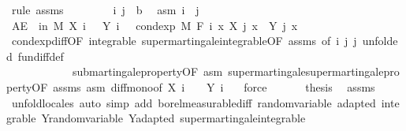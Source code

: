 \begin{isabellebody}
\ {\isacharparenleft}{\kern0pt}rule\ assms{\isacharparenright}{\kern0pt}\isanewline
\ \ \isacommand{{\isacharbraceleft}{\kern0pt}}\isamarkupfalse%
\isanewline
\ \ \ \ \isamarkupfalse%
\ i\ j\ {\isacharcolon}{\kern0pt}{\isacharcolon}{\kern0pt}\ {\isacharprime}{\kern0pt}b\ \isamarkupfalse%
\ asm{\isacharcolon}{\kern0pt}\ {\isachardoublequoteopen}i\ {\isasymle}\ j{\isachardoublequoteclose}\isanewline
\ \ \ \ \isamarkupfalse%
\ {\isachardoublequoteopen}AE\ {\isasymxi}\ in\ M{\isachardot}{\kern0pt}\ X\ i\ {\isasymxi}\ {\isacharminus}{\kern0pt}\ Y\ i\ {\isasymxi}\ {\isasymle}\ cond{\isacharunderscore}{\kern0pt}exp\ M\ {\isacharparenleft}{\kern0pt}F\ i{\isacharparenright}{\kern0pt}\ {\isacharparenleft}{\kern0pt}{\isasymlambda}x{\isachardot}{\kern0pt}\ X\ j\ x\ {\isacharminus}{\kern0pt}\ Y\ j\ x{\isacharparenright}{\kern0pt}\ {\isasymxi}{\isachardoublequoteclose}\ \isanewline
\ \ \ \ \ \ \isamarkupfalse%
\ cond{\isacharunderscore}{\kern0pt}exp{\isacharunderscore}{\kern0pt}diff{\isacharbrackleft}{\kern0pt}OF\ integrable\ supermartingale{\isachardot}{\kern0pt}integrable{\isacharbrackleft}{\kern0pt}OF\ assms{\isacharbrackright}{\kern0pt}{\isacharcomma}{\kern0pt}\ of\ i\ j\ j{\isacharcomma}{\kern0pt}\ unfolded\ fun{\isacharunderscore}{\kern0pt}diff{\isacharunderscore}{\kern0pt}def{\isacharbrackright}{\kern0pt}\ \isanewline
\ \ \ \ \ \ \ \ \ \ \ \ submartingale{\isacharunderscore}{\kern0pt}property{\isacharbrackleft}{\kern0pt}OF\ asm{\isacharbrackright}{\kern0pt}\ supermartingale{\isachardot}{\kern0pt}supermartingale{\isacharunderscore}{\kern0pt}property{\isacharbrackleft}{\kern0pt}OF\ assms\ asm{\isacharbrackright}{\kern0pt}\ diff{\isacharunderscore}{\kern0pt}mono{\isacharbrackleft}{\kern0pt}of\ {\isachardoublequoteopen}X\ i\ {\isacharunderscore}{\kern0pt}{\isachardoublequoteclose}\ {\isacharunderscore}{\kern0pt}\ {\isacharunderscore}{\kern0pt}\ {\isachardoublequoteopen}Y\ i\ {\isacharunderscore}{\kern0pt}{\isachardoublequoteclose}{\isacharbrackright}{\kern0pt}\ \isamarkupfalse%
\ force\isanewline
\ \ \isacommand{{\isacharbraceright}{\kern0pt}}\isamarkupfalse%
\isanewline
\ \ \isamarkupfalse%
\ {\isacharquery}{\kern0pt}thesis\ \isamarkupfalse%
\ assms\ \isamarkupfalse%
\ {\isacharparenleft}{\kern0pt}unfold{\isacharunderscore}{\kern0pt}locales{\isacharparenright}{\kern0pt}\ {\isacharparenleft}{\kern0pt}auto\ simp\ add{\isacharcolon}{\kern0pt}\ borel{\isacharunderscore}{\kern0pt}measurable{\isacharunderscore}{\kern0pt}diff\ random{\isacharunderscore}{\kern0pt}variable\ adapted\ integrable\ Y{\isachardot}{\kern0pt}random{\isacharunderscore}{\kern0pt}variable\ Y{\isachardot}{\kern0pt}adapted\ supermartingale{\isachardot}{\kern0pt}integrable{\isacharparenright}{\kern0pt}\ \ \isanewline

\end{isabellebody}

